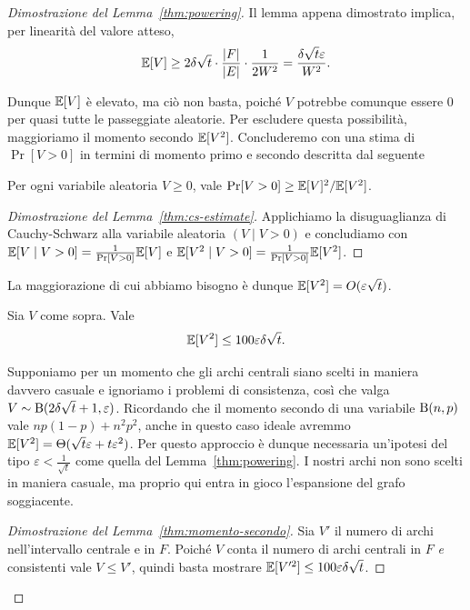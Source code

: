 \begin{proof}[Dimostrazione del Lemma~\ref{thm:powering}]
	Il lemma appena dimostrato implica, per linearità del valore atteso,
	\[
		\mathbb{E}[V] \ge 2 \delta \sqrt{t} \cdot \frac{|F|}{|E|} \cdot \frac1{2 W^2}
			  	= \frac{\delta \sqrt{t} \varepsilon}{W^2}.
	\]

	Dunque $\mathbb{E}[V]$ è elevato, ma ciò non basta, poiché $V$ potrebbe
	comunque essere $0$ per quasi tutte le passeggiate aleatorie.
	Per escludere questa possibilità, maggioriamo il momento secondo $\mathbb{E}[V^2]$.
	Concluderemo con una stima di $\Pr[V > 0]$ in termini di momento primo e
	secondo descritta dal seguente

	\begin{lemma} \label{thm:cs-estimate}
		Per ogni variabile aleatoria $V \ge 0$, vale $\Pr[V > 0] \ge \mathbb{E}[V]^2 / \mathbb{E}[V^2]$.
	\end{lemma}
	\begin{proof}[Dimostrazione del Lemma~\ref{thm:cs-estimate}]
		Applichiamo la disuguaglianza di Cauchy-Schwarz alla variabile aleatoria
		$(V \mid V > 0)$ e concludiamo con
		$\mathbb{E}[V \mid V > 0] = \frac1{\Pr[V > 0]} \mathbb{E}[V]$ e
		$\mathbb{E}[V^2 \mid V > 0] = \frac1{\Pr[V > 0]}\mathbb{E}[V^2]$.
	\end{proof}

	La maggiorazione di cui abbiamo bisogno è dunque
	$\mathbb{E}[V^2] = O(\varepsilon \sqrt{t})$.

	\begin{lemma} \label{thm:momento-secondo}
		Sia $V$ come sopra. Vale
		\[
			\mathbb{E}[V^2] \le 100 \varepsilon \delta \sqrt{t}.
		\]
	\end{lemma}

	Supponiamo per un momento che gli archi centrali siano scelti in maniera
	davvero casuale e ignoriamo i problemi di consistenza, così che valga
	$V \sim \operatorname{B}(2\delta\sqrt{t} + 1, \varepsilon)$.
	Ricordando che il momento secondo di una variabile $\operatorname{B}(n, p)$ vale
	$n p (1 - p) + n^2 p^2$, anche in questo caso ideale avremmo
	$\mathbb{E}[V^2] = \Theta(\sqrt{t} \varepsilon + t \varepsilon^2)$.
	Per questo approccio è dunque necessaria un'ipotesi del tipo
	$\varepsilon < \frac1{\sqrt{t}}$ come quella del Lemma~\ref{thm:powering}.
	I nostri archi non sono scelti in maniera casuale, ma proprio qui entra in
	gioco l'espansione del grafo soggiacente.

	\begin{proof}[Dimostrazione del Lemma~\ref{thm:momento-secondo}]
		Sia $V'$ il numero di archi nell'intervallo centrale e in $F$.
		Poiché $V$ conta il numero di archi centrali in $F$ \emph{e}
		consistenti vale $V \le V'$, quindi basta mostrare
		$\mathbb{E}[V'^2] \le 100 \varepsilon \delta \sqrt{t}$.


\end{proof}
\end{proof}
